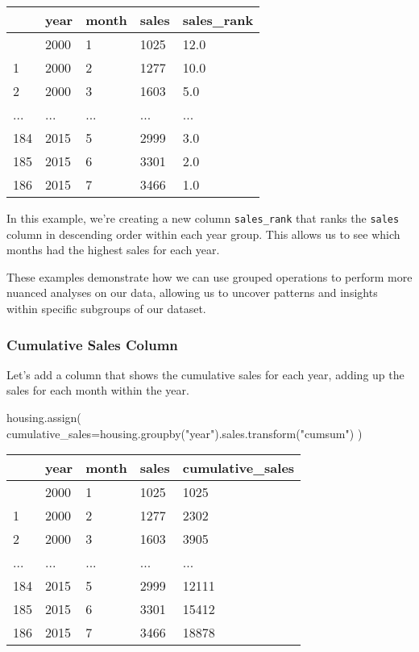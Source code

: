 \documentclass[
  letterpaper,
  DIV=11,
  numbers=noendperiod]{scrreprt}
\newenvironment{Shaded}{\begin{snugshade}}{\end{snugshade}}
\newcommand{\NormalTok}[1]{\textcolor[rgb]{0.00,0.23,0.31}{#1}}
\newcommand{\OperatorTok}[1]{\textcolor[rgb]{0.37,0.37,0.37}{#1}}
\newcommand{\StringTok}[1]{\textcolor[rgb]{0.13,0.47,0.30}{#1}}
\begin{document}
\begin{longtable}[]{@{}lllll@{}}
\toprule\noalign{}
& year & month & sales & sales\_rank \\
\midrule\noalign{}
\endhead
\bottomrule\noalign{}
\endlastfoot
0 & 2000 & 1 & 1025 & 12.0 \\
1 & 2000 & 2 & 1277 & 10.0 \\
2 & 2000 & 3 & 1603 & 5.0 \\
... & ... & ... & ... & ... \\
184 & 2015 & 5 & 2999 & 3.0 \\
185 & 2015 & 6 & 3301 & 2.0 \\
186 & 2015 & 7 & 3466 & 1.0 \\
\end{longtable}

In this example, we're creating a new column \texttt{sales\_rank} that
ranks the \texttt{sales} column in descending order within each year
group. This allows us to see which months had the highest sales for each
year.

These examples demonstrate how we can use grouped operations to perform
more nuanced analyses on our data, allowing us to uncover patterns and
insights within specific subgroups of our dataset.

\subsubsection{Cumulative Sales Column}\label{cumulative-sales-column}

Let's add a column that shows the cumulative sales for each year, adding
up the sales for each month within the year.

\begin{Shaded}
\begin{Highlighting}[]
\NormalTok{housing.assign(}
\NormalTok{    cumulative\_sales}\OperatorTok{=}\NormalTok{housing.groupby(}\StringTok{"year"}\NormalTok{).sales.transform(}\StringTok{"cumsum"}\NormalTok{)}
\NormalTok{)}
\end{Highlighting}
\end{Shaded}

\begin{longtable}[]{@{}lllll@{}}
\toprule\noalign{}
& year & month & sales & cumulative\_sales \\
\midrule\noalign{}
\endhead
\bottomrule\noalign{}
\endlastfoot
0 & 2000 & 1 & 1025 & 1025 \\
1 & 2000 & 2 & 1277 & 2302 \\
2 & 2000 & 3 & 1603 & 3905 \\
... & ... & ... & ... & ... \\
184 & 2015 & 5 & 2999 & 12111 \\
185 & 2015 & 6 & 3301 & 15412 \\
186 & 2015 & 7 & 3466 & 18878 \\
\end{longtable}
\end{document}
